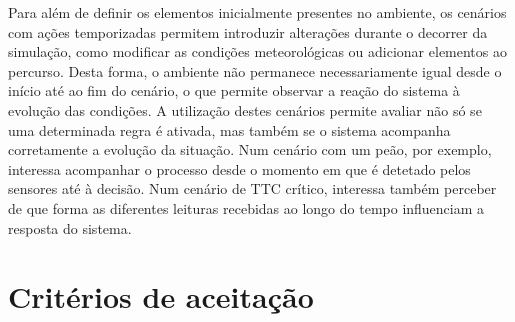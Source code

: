 Para além de definir os elementos inicialmente presentes no ambiente, os
cenários com ações temporizadas permitem introduzir alterações durante o
decorrer da simulação, como modificar as condições meteorológicas ou
adicionar elementos ao percurso. Desta forma, o ambiente não permanece
necessariamente igual desde o início até ao fim do cenário, o que permite
observar a reação do sistema à evolução das condições. A utilização destes
cenários permite avaliar não só se uma determinada regra é ativada, mas
também se o sistema acompanha corretamente a evolução da situação. Num
cenário com um peão, por exemplo, interessa acompanhar o processo desde o
momento em que é detetado pelos sensores até à decisão. Num cenário de TTC
crítico, interessa também perceber de que forma as diferentes leituras
recebidas ao longo do tempo influenciam a resposta do sistema.

\section{Critérios de aceitação}
\label{sec:criterios}

